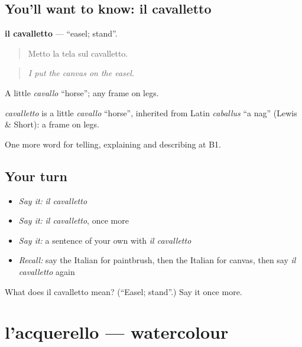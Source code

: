 \subsection*{You'll want to know: il cavalletto}
\textbf{il cavalletto} — \textquotedblleft{}easel; stand\textquotedblright{}.

\begin{quote}
Metto la tela sul cavalletto.
\end{quote}

\begin{quote}
\emph{I put the canvas on the easel.}
\end{quote}

A little \emph{cavallo} \textquotedblleft{}horse\textquotedblright{}; any frame on legs.

\begin{cousinweb}
\emph{cavalletto} is a little \emph{cavallo} \textquotedblleft{}horse\textquotedblright{}, inherited from Latin \emph{caballus} \textquotedblleft{}a nag\textquotedblright{} (Lewis \& Short): a frame on legs.
\end{cousinweb}

\begin{grammarlens}[title={What you've built}]
One more word for telling, explaining and describing at B1.
\end{grammarlens}

\subsection*{Your turn}
\begin{itemize}
\raggedright
  \item \emph{Say it:} \emph{il cavalletto}
  \item \emph{Say it:} \emph{il cavalletto}, once more
  \item \emph{Say it:} a sentence of your own with \emph{il cavalletto}
  \item \emph{Recall:} say the Italian for paintbrush, then the Italian for canvas, then say \emph{il cavalletto} again
\end{itemize}

\begin{tcolorbox}[breakable,colback=teal!4,colframe=teal!35!black,title={Before you move on}]
What does il cavalletto mean? (\textquotedblleft{}Easel; stand\textquotedblright{}.) Say it once more.
\end{tcolorbox}
\section[l'acquerello]{l'acquerello — watercolour}

